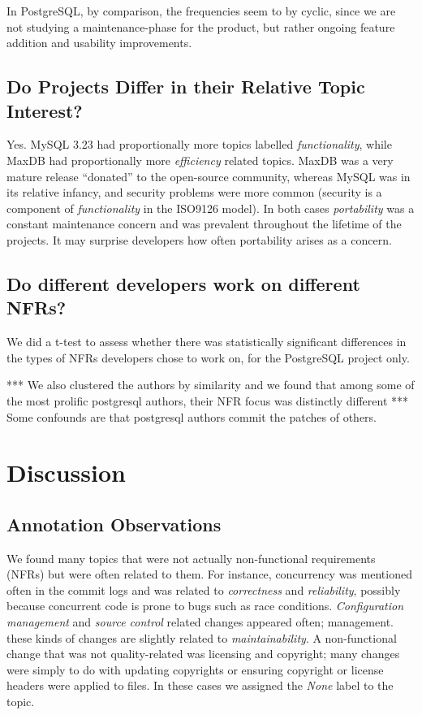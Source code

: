 \documentclass[smallextended]{svjour3}       %
\begin{document}
In PostgreSQL, by comparison, the frequencies seem to by cyclic, since we are not studying a maintenance-phase for the product, but rather ongoing
feature addition and usability improvements.

\subsection{Do Projects Differ in their Relative  Topic Interest?}
Yes. MySQL 3.23 had proportionally more
topics labelled \emph{functionality}, while MaxDB had proportionally more
\emph{efficiency} related topics. MaxDB was a very mature release ``donated'' to the open-source community, 
whereas MySQL was in its relative infancy, and	
security problems were more common (security is a component of \emph{functionality} in the ISO9126 model). 
In both cases \emph{portability} was a constant maintenance concern and was prevalent throughout the lifetime of the projects. It may surprise developers
how often portability arises as a concern.

\subsection{Do different developers work on different NFRs?}
We did a t-test to assess whether there was statistically significant differences in the types of NFRs developers chose to work on, for the PostgreSQL project only. 

*** We also clustered the authors by similarity and we found that
among some of the most prolific postgresql authors, their NFR focus
was distinctly different *** Some confounds are that postgresql
authors commit the patches of others.

\section{Discussion}
\label{sec:limit}

\subsection{Annotation Observations}
We found many topics that were not actually non-functional requirements (NFRs) but were often related to them. 
For instance, concurrency was mentioned often in the commit logs and
was related to \emph{correctness} and \emph{reliability}, possibly because concurrent code is prone to bugs such as race conditions. %
\emph{Configuration management} and \emph{source control} related changes appeared often; %
management. 
these kinds of changes are slightly related to \emph{maintainability}. 
A non-functional change that was not quality-related was licensing and
copyright; many changes were simply to do with updating copyrights or
ensuring copyright or license headers were applied to files. In these
cases we assigned the \emph{None} label to the topic.
\end{document}
